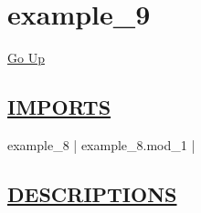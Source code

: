 \chapter*{\color{headfile}
example_9
}
\hypertarget{ecldoc:toc:example_9}{}
\hyperlink{ecldoc:toc:root}{Go Up}

\section*{\underline{\textsf{IMPORTS}}}
\begin{doublespace}
{\large
example\_8 |
example\_8.mod\_1 |
}
\end{doublespace}

\section*{\underline{\textsf{DESCRIPTIONS}}}

